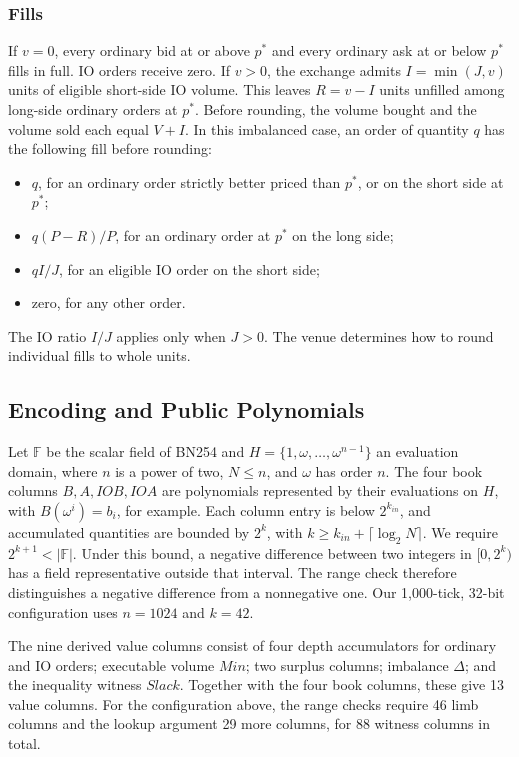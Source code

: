 \subsubsection{Fills}
\label{app:zq-fills}

If \(v=0\), every ordinary bid at or above \(p^*\) and every ordinary ask at or below \(p^*\) fills in full. IO orders receive zero. If \(v>0\), the exchange admits \(I=\min(J,v)\) units of eligible short-side IO volume. This leaves \(R=v-I\) units unfilled among long-side ordinary orders at \(p^*\). Before rounding, the volume bought and the volume sold each equal \(V+I\). In this imbalanced case, an order of quantity \(q\) has the following fill before rounding:
\begin{itemize}
\item \(q\), for an ordinary order strictly better priced than \(p^*\), or on the short side at \(p^*\);
\item \(q(P-R)/P\), for an ordinary order at \(p^*\) on the long side;
\item \(qI/J\), for an eligible IO order on the short side;
\item zero, for any other order.
\end{itemize}
The IO ratio \(I/J\) applies only when \(J>0\). The venue determines how to round individual fills to whole units.

\subsection{Encoding and Public Polynomials}

Let \(\mathbb F\) be the scalar field of BN254 and \(H=\{1,\omega,\ldots,\omega^{n-1}\}\) an evaluation domain, where \(n\) is a power of two, \(N\le n\), and \(\omega\) has order \(n\). The four book columns \(B,A,IOB,IOA\) are polynomials represented by their evaluations on \(H\), with \(B(\omega^i)=b_i\), for example. Each column entry is below \(2^{k_{in}}\), and accumulated quantities are bounded by \(2^k\), with \(k\ge k_{in}+\lceil\log_2 N\rceil\). We require \(2^{k+1}<|\mathbb F|\). Under this bound, a negative difference between two integers in \([0,2^k)\) has a field representative outside that interval. The range check therefore distinguishes a negative difference from a nonnegative one. Our 1,000-tick, 32-bit configuration uses \(n=1024\) and \(k=42\).

The nine derived value columns consist of four depth accumulators for ordinary and IO orders; executable volume \(Min\); two surplus columns; imbalance \(\Delta\); and the inequality witness \(Slack\). Together with the four book columns, these give 13 value columns. For the configuration above, the range checks require 46 limb columns and the lookup argument 29 more columns, for 88 witness columns in total.

